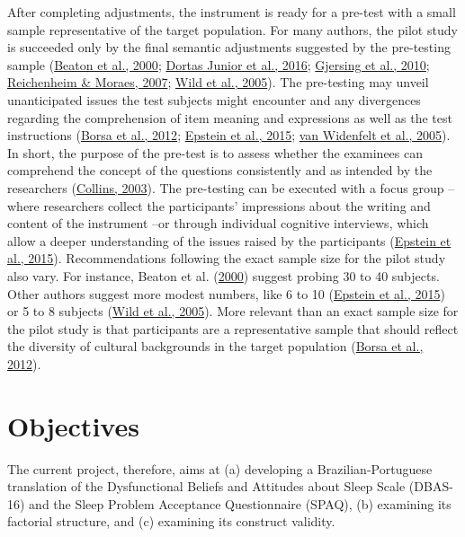 \documentclass[
  ,doc,11pt, twoside,floatsintext]{apa6}
\begin{document}
After completing adjustments, the instrument is ready for a pre-test with a small sample representative of the target population. For many authors, the pilot study is succeeded only by the final semantic adjustments suggested by the pre-testing sample (\protect\hyperlink{ref-beaton2000}{Beaton et al., 2000}; \protect\hyperlink{ref-dortasjunior2016}{Dortas Junior et al., 2016}; \protect\hyperlink{ref-gjersing2010}{Gjersing et al., 2010}; \protect\hyperlink{ref-reichenheim2007}{Reichenheim \& Moraes, 2007}; \protect\hyperlink{ref-wild2005}{Wild et al., 2005}). The pre-testing may unveil unanticipated issues the test subjects might encounter and any divergences regarding the comprehension of item meaning and expressions as well as the test instructions (\protect\hyperlink{ref-borsaAdaptacaoValidacaoInstrumentos2012}{Borsa et al., 2012}; \protect\hyperlink{ref-epstein2015}{Epstein et al., 2015}; \protect\hyperlink{ref-vanwidenfelt2005}{van Widenfelt et al., 2005}). In short, the purpose of the pre-test is to assess whether the examinees can comprehend the concept of the questions consistently and as intended by the researchers (\protect\hyperlink{ref-collins2003}{Collins, 2003}). The pre-testing can be executed with a focus group -- where researchers collect the participants' impressions about the writing and content of the instrument --or through individual cognitive interviews, which allow a deeper understanding of the issues raised by the participants (\protect\hyperlink{ref-epstein2015}{Epstein et al., 2015}). Recommendations following the exact sample size for the pilot study also vary. For instance, Beaton et al. (\protect\hyperlink{ref-beaton2000}{2000}) suggest probing 30 to 40 subjects. Other authors suggest more modest numbers, like 6 to 10 (\protect\hyperlink{ref-epstein2015}{Epstein et al., 2015}) or 5 to 8 subjects (\protect\hyperlink{ref-wild2005}{Wild et al., 2005}). More relevant than an exact sample size for the pilot study is that participants are a representative sample that should reflect the diversity of cultural backgrounds in the target population (\protect\hyperlink{ref-borsaAdaptacaoValidacaoInstrumentos2012}{Borsa et al., 2012}).

\hypertarget{objectives}{%
\section{Objectives}\label{objectives}}

The current project, therefore, aims at (a) developing a Brazilian-Portuguese translation of the Dysfunctional Beliefs and Attitudes about Sleep Scale (DBAS-16) and the Sleep Problem Acceptance Questionnaire (SPAQ), (b) examining its factorial structure, and (c) examining its construct validity.
\end{document}
